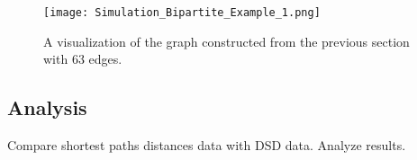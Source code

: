 \begin{figure}[!ht]
\centering
\texttt{[image: Simulation\_Bipartite\_Example\_1.png]}
\caption{A visualization of the graph constructed from the previous section with 63 edges.}
\label{fig:bip_ex_1}
\end{figure}


\subsection{Analysis}
\noindent
Compare shortest paths distances data with DSD data. Analyze results.

